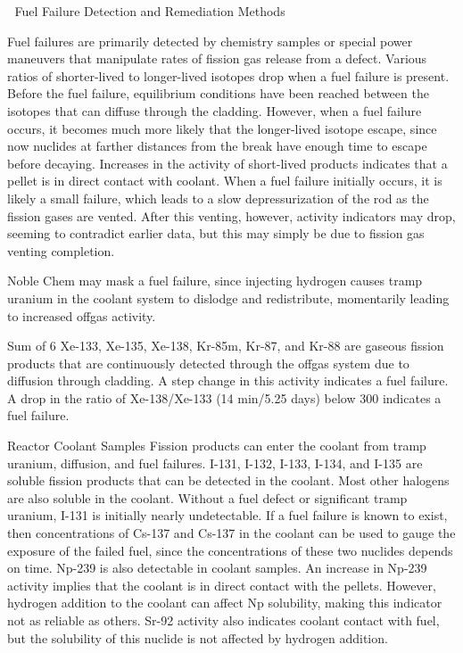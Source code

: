 \documentclass[10pt]{article}
\begin{document}

Fuel Failure Detection and Remediation Methods

Fuel failures are primarily detected by chemistry samples or special power maneuvers that manipulate rates of fission gas release from a defect. Various ratios of shorter-lived to longer-lived isotopes drop when a fuel failure is present. Before the fuel failure, equilibrium conditions have been reached between the isotopes that can diffuse through the cladding. However, when a fuel failure occurs, it becomes much more likely that the longer-lived isotope escape, since now nuclides at farther distances from the break have enough time to escape before decaying. Increases in the activity of short-lived products indicates that a pellet is in direct contact with coolant. When a fuel failure initially occurs, it is likely a small failure, which leads to a slow depressurization of the rod as the fission gases are vented. After this venting, however, activity indicators may drop, seeming to contradict earlier data, but this may simply be due to fission gas venting completion.

Noble Chem may mask a fuel failure, since injecting hydrogen causes tramp uranium in the coolant system to dislodge and redistribute, momentarily leading to increased offgas activity. 

Sum of 6
Xe-133, Xe-135, Xe-138, Kr-85m, Kr-87, and Kr-88 are gaseous fission products that are continuously detected through the offgas system due to diffusion through cladding. A step change in this activity indicates a fuel failure. A drop in the ratio of Xe-138/Xe-133 (14 min/5.25 days) below 300 indicates a fuel failure. 

Reactor Coolant Samples
Fission products can enter the coolant from tramp uranium, diffusion, and fuel failures. I-131, I-132, I-133, I-134, and I-135 are soluble fission products that can be detected in the coolant. Most other halogens are also soluble in the coolant. Without a fuel defect or significant tramp uranium, I-131 is initially nearly undetectable. If a fuel failure is known to exist, then concentrations of Cs-137 and Cs-137 in the coolant can be used to gauge the exposure of the failed fuel, since the concentrations of these two nuclides depends on time. Np-239 is also detectable in coolant samples. An increase in Np-239 activity implies that the coolant is in direct contact with the pellets. However, hydrogen addition to the coolant can affect Np solubility, making this indicator not as reliable as others. Sr-92 activity also indicates coolant contact with fuel, but the solubility of this nuclide is not affected by hydrogen addition. 
\end{document}
